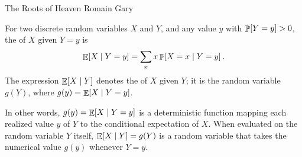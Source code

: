 %




\ChapterPrefix{}
\ChapterGen{}

%
{The Roots of Heaven}%
{Romain Gary}







\begin{defn}
    For two discrete random variables $X$ and $Y$, and any value $y$
    with $\Prob{Y = y} > 0$, the  of
    $X$ given $Y = y$ is
    \begin{equation*}
        \ExCond{X}{Y = y}%
        =%
        \sum_{x} x \ProbCond{X = x}{Y = y}.
    \end{equation*}
    The expression $\mathop{\mathbb{E}}\!\left[ X \;\middle\vert\; Y \right]$ denotes the  of $X$ given $Y$; it
    is the random variable $g(Y)$, where $g(y) = \mathop{\mathbb{E}}\!\left[ X \;\middle\vert\; Y = y \right]$.
\end{defn}

In other words, $g(y) = \mathop{\mathbb{E}}\!\left[ X \;\middle\vert\; Y=y \right]$ is a deterministic function
mapping each realized value $y$ of $Y$ to the conditional expectation of
$X$. When evaluated on the random variable $Y$ itself,
$\mathop{\mathbb{E}}\!\left[ X \;\middle\vert\; Y \right] = g(Y)$ is a random variable that takes the numerical
value $g(y)$ whenever $Y = y$.

